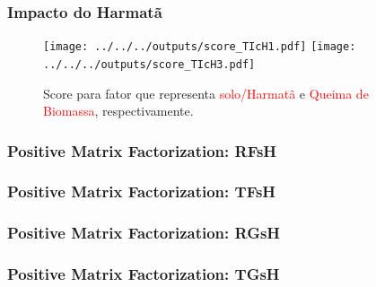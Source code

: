 \begin{frame}
  \frametitle{}
    
\end{frame}

\begin{frame}
  \frametitle{}
    
\end{frame}

\begin{frame}
  \frametitle{Impacto do Harmatã}
  \begin{figure}[H]
   \centering
    \texttt{[image: ../../../outputs/score\_TIcH1.pdf]}
    \texttt{[image: ../../../outputs/score\_TIcH3.pdf]}
    \caption{Score para fator que representa 
             \textcolor{red}{solo/Harmatã} e \textcolor{red}{Queima de Biomassa}, respectivamente.}
  \end{figure}
\end{frame}

\begin{frame}
  \frametitle{Positive Matrix Factorization: RFsH}
    \begin{tiny}
      
      
    \end{tiny}
\end{frame}

\begin{frame}
  \frametitle{Positive Matrix Factorization: TFsH}
    \begin{tiny}
      
      
    \end{tiny}
\end{frame}

\begin{frame}
  \frametitle{Positive Matrix Factorization: RGsH}
    \begin{tiny}
      
      
    \end{tiny}
\end{frame}

\begin{frame}
  \frametitle{Positive Matrix Factorization: TGsH}
    \begin{tiny}
      
      
    \end{tiny}
\end{frame}



